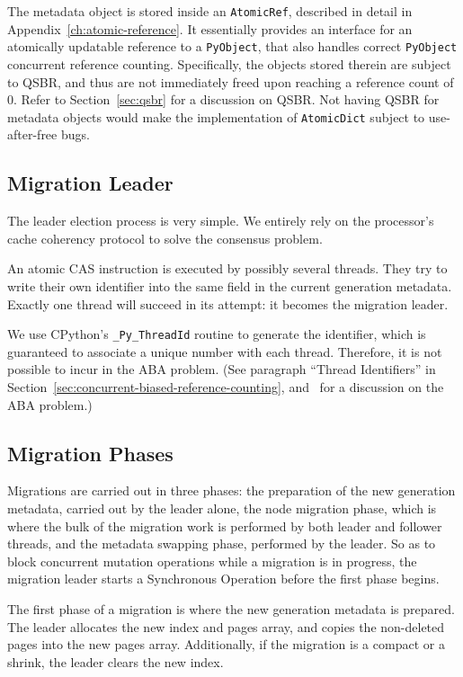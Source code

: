 The metadata object is stored inside an \texttt{AtomicRef}, described in detail in Appendix~\ref{ch:atomic-reference}.
It essentially provides an interface for an atomically updatable reference to a \texttt{PyObject}, that also handles correct \texttt{PyObject} concurrent reference counting.
Specifically, the objects stored therein are subject to QSBR, and thus are not immediately freed upon reaching a reference count of 0.
Refer to Section~\ref{sec:qsbr} for a discussion on QSBR\@.
Not having QSBR for metadata objects would make the implementation of \texttt{AtomicDict} subject to use-after-free bugs.

\subsection{Migration Leader}\label{subsec:migration-leader}

The leader election process is very simple.
We entirely rely on the processor's cache coherency protocol to solve the consensus problem.

An atomic CAS instruction is executed by possibly several threads.
They try to write their own identifier into the same field in the current generation metadata.
Exactly one thread will succeed in its attempt: it becomes the migration leader.

We use CPython's \texttt{\_Py\_ThreadId} routine to generate the identifier, which is guaranteed to associate a unique number with each thread.
Therefore, it is not possible to incur in the ABA problem.
(See paragraph ``Thread Identifiers'' in Section~\ref{sec:concurrent-biased-reference-counting}, and~\cite[\S10.6]{art-mp} for a discussion on the ABA problem.)

\subsection{Migration Phases}\label{subsec:migration-phases}

Migrations are carried out in three phases: the preparation of the new generation metadata, carried out by the leader alone, the node migration phase, which is where the bulk of the migration work is performed by both leader and follower threads, and the metadata swapping phase, performed by the leader.
So as to block concurrent mutation operations while a migration is in progress, the migration leader starts a Synchronous Operation before the first phase begins.

The first phase of a migration is where the new generation metadata is prepared.
The leader allocates the new index and pages array, and copies the non-deleted pages into the new pages array.
Additionally, if the migration is a compact or a shrink, the leader clears the new index.

